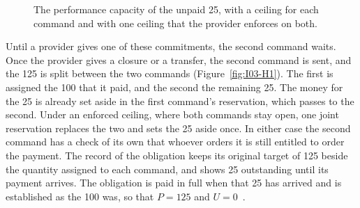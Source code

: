 \documentclass{momentum}
\begin{document}
\begin{figure}[htbp]
\centering
{}
\caption{The performance capacity of the unpaid 25, with a ceiling for each command and with one ceiling that the provider enforces on both.}
\label{fig:capacities}
\end{figure}

Until a provider gives one of these commitments, the second command waits. Once the provider gives a closure or a transfer, the second command is sent, and the 125 is split between the two commands (Figure~\ref{fig:I03-H1}). The first is assigned the 100 that it paid, and the second the remaining 25. The money for the 25 is already set aside in the first command's reservation, which passes to the second. Under an enforced ceiling, where both commands stay open, one joint reservation replaces the two and sets the 25 aside once. In either case the second command has a check of its own that whoever orders it is still entitled to order the payment. The record of the obligation keeps its original target of 125 beside the quantity assigned to each command, and shows 25 outstanding until its payment arrives. The obligation is paid in full when that 25 has arrived and is established as the 100 was, so that $P=125$ and $U=0$~\cite[Sections~5.9 and~6]{op}.
\end{document}
